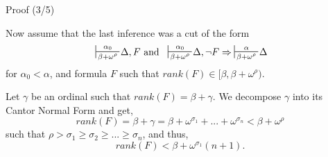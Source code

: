 \documentclass[10pt]{beamer}
\newcommand{\sintcons}[2]{\;\sststile{#2}{#1}\!}
\begin{document}
\begin{frame}{Proof (3/5)}

Now assume that the last inference was a cut of the form
$$
\sintcons{\alpha_0}{\beta+\omega^\rho} \Delta, F
\text{ and }
\sintcons{\alpha_0}{\beta+\omega^\rho} \Delta, \neg F \Rightarrow
\sintcons{\alpha}{\beta+\omega^\rho}\Delta
$$
for $\alpha_0 < \alpha$, and formula $F$ such that $rank(F) \in [\beta, \beta + \omega^\rho)$.

\pause


Let $\gamma$ be an ordinal such that $rank(F) = \beta + \gamma$. We decompose $\gamma$ into its Cantor Normal Form and get,
$$
rank(F) = \beta + \gamma = \beta + \omega^{\sigma_1} + ... + \omega^{\sigma_n}
< \beta + \omega^\rho
$$
such that $\rho > \sigma_1 \geq \sigma_2 \geq ... \geq \sigma_n$, and thus,
$$
rank(F) < \beta + \omega^{\sigma_1}(n+1).
$$


\end{frame}
\end{document}
